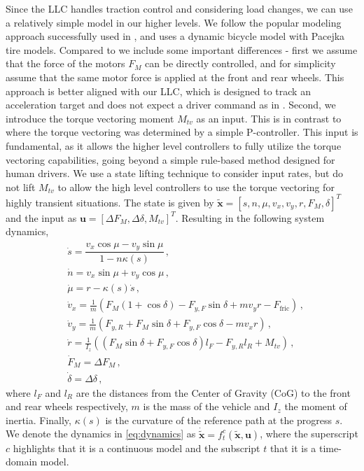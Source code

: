 Since the LLC handles traction control and considering load changes, we can use a relatively simple model in our higher levels. We follow the popular modeling approach successfully used in \cite{Liniger2015,Kabzan2019_AMZ,vazquez2020optimization}, and uses a dynamic bicycle model with Pacejka tire models. Compared to \cite{vazquez2020optimization} we include some important differences - first we assume that the force of the motors $F_M$ can be directly controlled, and for simplicity assume that the same motor force is applied at the front and rear wheels. This approach is better aligned with our LLC, which is designed to track an acceleration target and does not expect a driver command as in \cite{vazquez2020optimization}. Second, we introduce the torque vectoring moment $M_{tv}$ as an input. This is in contrast to \cite{Kabzan2019_AMZ,vazquez2020optimization} where the torque vectoring was determined by a simple P-controller. This input is fundamental, as it allows the higher level controllers to fully utilize the torque vectoring capabilities, going beyond a simple rule-based method designed for human drivers. We use a state lifting technique to consider input rates, but do not lift $M_{tv}$ to allow the high level controllers to use the torque vectoring for highly transient situations. The state is given by $\mathbf{\tilde{x}} = [s, n, \mu, v_x, v_y, r, F_M, \delta]^T$ and the input as $\mathbf{u} = [\Delta F_M,\Delta \delta,  M_{tv}]^T$. Resulting in the following system dynamics,
\begin{align}
\label{eq:dynamics}
    &\dot{s} = \dfrac{v_x\cos{\mu}-v_y\sin{\mu}}{1-n \kappa(s)}\,, \nonumber\\
    &\dot{n} = v_x\sin{\mu}+v_y\cos{\mu}\,, \nonumber\\
    &\dot{\mu} = r - \kappa(s) \dot{s}\,, \\
    &\dot{v}_x = \tfrac{1}{m}(F_M (1+\cos{\delta}) - F_{y,F} \sin{\delta} + m v_y r - F_{\text{fric}})\,, \nonumber\\
    &\dot{v}_y = \tfrac{1}{m}(F_{y,R} + F_M  \sin{\delta} + F_{y,F} \cos{\delta} - m v_x r)\,,\nonumber\\
    &\dot{r} = \tfrac{1}{I_z}((F_M  \sin{\delta} + F_{y,F} \cos{\delta})l_F - F_{y,R}l_R + M_{tv})\,,\nonumber \\
    &\dot{F}_M = \Delta F_M\,, \nonumber \\
    &\dot{\delta} = \Delta \delta\,, \nonumber
\end{align}
where $l_F$ and $l_R$ are the distances from the Center of Gravity (CoG) to the front and rear wheels respectively, $m$ is the mass of the vehicle and $I_z$ the moment of inertia. Finally, $\kappa(s)$ is the curvature of the reference path at the progress $s$. We denote the dynamics in \eqref{eq:dynamics} as $\mathbf{\dot{\tilde{x}}} = f^c_t(\mathbf{\tilde{x}}, \mathbf{u})$, where the superscript $c$ highlights that it is a continuous model and the subscript $t$ that it is a time-domain model.

